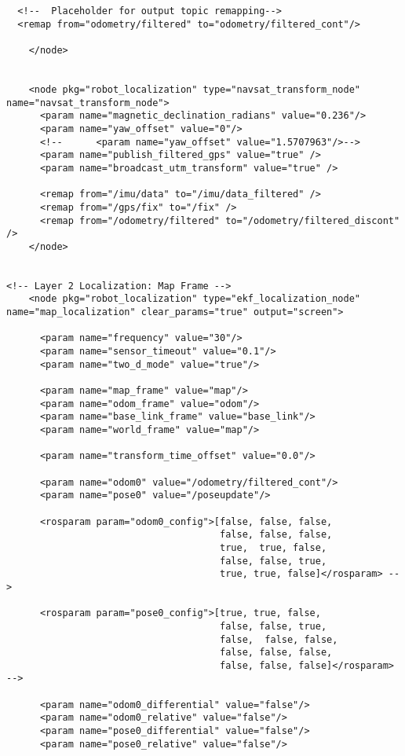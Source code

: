 \begin{verbatim}
  <!--  Placeholder for output topic remapping-->
  <remap from="odometry/filtered" to="odometry/filtered_cont"/>
      
    </node>
    

    <node pkg="robot_localization" type="navsat_transform_node" name="navsat_transform_node">
      <param name="magnetic_declination_radians" value="0.236"/>
      <param name="yaw_offset" value="0"/>
      <!--      <param name="yaw_offset" value="1.5707963"/>-->
      <param name="publish_filtered_gps" value="true" />
      <param name="broadcast_utm_transform" value="true" />

      <remap from="/imu/data" to="/imu/data_filtered" />
      <remap from="/gps/fix" to="/fix" />
      <remap from="/odometry/filtered" to="/odometry/filtered_discont" />
    </node>


<!-- Layer 2 Localization: Map Frame -->
    <node pkg="robot_localization" type="ekf_localization_node" name="map_localization" clear_params="true" output="screen">

      <param name="frequency" value="30"/>
      <param name="sensor_timeout" value="0.1"/>
      <param name="two_d_mode" value="true"/>

      <param name="map_frame" value="map"/>
      <param name="odom_frame" value="odom"/>
      <param name="base_link_frame" value="base_link"/>
      <param name="world_frame" value="map"/>

      <param name="transform_time_offset" value="0.0"/>

      <param name="odom0" value="/odometry/filtered_cont"/>
      <param name="pose0" value="/poseupdate"/>

      <rosparam param="odom0_config">[false, false, false,
                                      false, false, false,
                                      true,  true, false,
                                      false, false, true,
                                      true, true, false]</rosparam> -->

      <rosparam param="pose0_config">[true, true, false,
                                      false, false, true,
                                      false,  false, false,
                                      false, false, false,
                                      false, false, false]</rosparam> -->

      <param name="odom0_differential" value="false"/>
      <param name="odom0_relative" value="false"/>
      <param name="pose0_differential" value="false"/>
      <param name="pose0_relative" value="false"/>


\end{verbatim}
